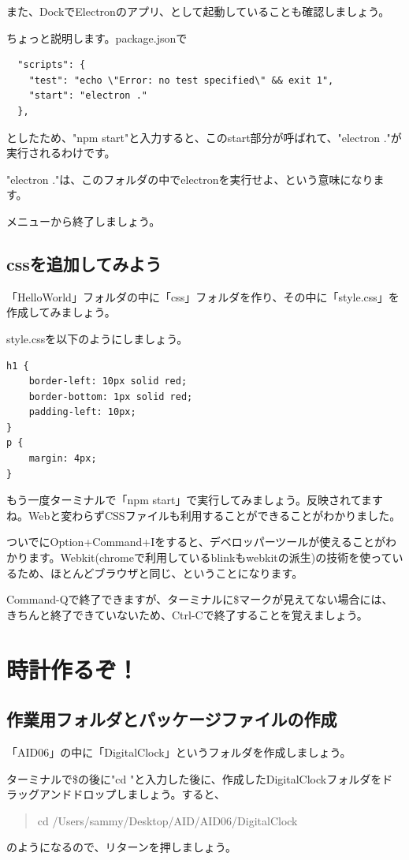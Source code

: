\documentclass[mingoth,11pt,a4j,uplatex]{jsarticle}
\begin{document}
また、DockでElectronのアプリ、として起動していることも確認しましょう。

ちょっと説明します。package.jsonで
\begin{verbatim}
  "scripts": {
    "test": "echo \"Error: no test specified\" && exit 1",
    "start": "electron ."
  },
\end{verbatim}
としたため、"npm start"と入力すると、このstart部分が呼ばれて、"electron ."が実行されるわけです。

"electron ."は、このフォルダの中でelectronを実行せよ、という意味になります。

メニューから終了しましょう。

\subsection{cssを追加してみよう}
「HelloWorld」フォルダの中に「css」フォルダを作り、その中に「style.css」を作成してみましょう。

style.cssを以下のようにしましょう。

\begin{lstlisting}[caption=Hello World：css/style.css]
h1 {
    border-left: 10px solid red;
    border-bottom: 1px solid red;
    padding-left: 10px;
}
p {
    margin: 4px;
}
\end{lstlisting}
もう一度ターミナルで「npm start」で実行してみましょう。反映されてますね。Webと変わらずCSSファイルも利用することができることがわかりました。

ついでにOption+Command+Iをすると、デベロッパーツールが使えることがわかります。Webkit(chromeで利用しているblinkもwebkitの派生)の技術を使っているため、ほとんどブラウザと同じ、ということになります。

Command-Qで終了できますが、ターミナルに\$マークが見えてない場合には、きちんと終了できていないため、Ctrl-Cで終了することを覚えましょう。

\section{時計作るぞ！}

\subsection{作業用フォルダとパッケージファイルの作成}
「AID06」の中に「DigitalClock」というフォルダを作成しましょう。

ターミナルで\$の後に"cd "と入力した後に、作成したDigitalClockフォルダをドラッグアンドドロップしましょう。すると、
\begin{quote}
cd /Users/sammy/Desktop/AID/AID06/DigitalClock 
\end{quote}
のようになるので、リターンを押しましょう。
\end{document}
